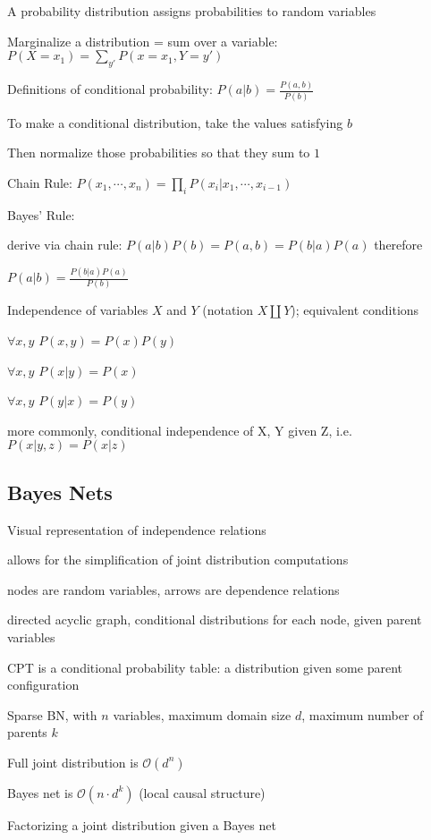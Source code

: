 \documentclass[12pt]{article}
\begin{document}
A probability distribution assigns probabilities to random variables

Marginalize a distribution = sum over a variable: $P(X = x_1) = \sum_{y'} P(x = x_1, Y = y')$

\noindent
Definitions of conditional probability: $P(a | b) = \frac{P(a, b)}{P(b)}$

To make a conditional distribution, take the values satisfying $b$

Then normalize those probabilities so that they sum to $1$

Chain Rule: $P(x_1, \cdots, x_n) = \prod_i P(x_i|x_1, \cdots, x_{i - 1})$

\noindent
Bayes' Rule:

derive via chain rule: $P(a|b)P(b) = P(a, b) = P(b|a)P(a)$ therefore

$P(a|b) = \frac{P(b|a)P(a)}{P(b)}$

\noindent
Independence of variables $X$ and $Y$ (notation $X \coprod Y$); equivalent conditions

$\forall x, y$ $P(x, y) = P(x)P(y)$

$\forall x, y$ $P(x|y) = P(x)$

$\forall x, y$ $P(y|x) = P(y)$

more commonly, conditional independence of X, Y given Z, i.e. $P(x |y, z) = P(x|z)$

\subsection{Bayes Nets}

\noindent
Visual representation of independence relations

allows for the simplification of joint distribution computations

nodes are random variables, arrows are dependence relations

directed acyclic graph, conditional distributions for each node, given parent variables

CPT is a conditional probability table: a distribution given some parent configuration

\noindent
Sparse BN, with $n$ variables, maximum domain size $d$, maximum number of parents $k$

Full joint distribution is $\mathcal{O}(d^n)$

Bayes net is $\mathcal{O}(n \cdot d^k)$ (local causal structure)

\noindent
Factorizing a joint distribution given a Bayes net
\end{document}
